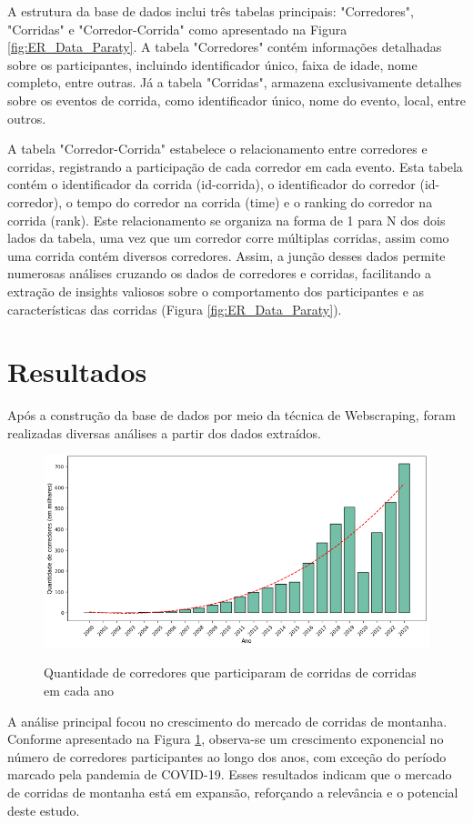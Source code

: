 A estrutura da base de dados inclui três tabelas principais: "Corredores", "Corridas" e "Corredor-Corrida" como apresentado na Figura \ref{fig:ER_Data_Paraty}. A tabela "Corredores" contém informações detalhadas sobre os participantes, incluindo identificador único, faixa de idade, nome completo, entre outras. Já a tabela "Corridas", armazena exclusivamente detalhes sobre os eventos de corrida, como identificador único, nome do evento, local, entre outros.

A tabela "Corredor-Corrida" estabelece o relacionamento entre corredores e corridas, registrando a participação de cada corredor em cada evento. Esta tabela contém o identificador da corrida (id-corrida), o identificador do corredor (id-corredor), o tempo do corredor na corrida (time) e o ranking do corredor na corrida (rank). Este relacionamento se organiza na forma de 1 para N dos dois lados da tabela, uma vez que um corredor corre múltiplas corridas, assim como uma corrida contém diversos corredores. Assim, a junção desses dados permite numerosas análises cruzando os dados de corredores e corridas, facilitando a extração de insights valiosos sobre o comportamento dos participantes e as características das corridas (Figura \ref{fig:ER_Data_Paraty}).

\section{Resultados}

Após a construção da base de dados por meio da técnica de Webscraping, foram realizadas diversas análises a partir dos dados extraídos.

\begin{figure}
    \centering
    \caption{Quantidade de corredores que participaram de corridas de corridas em cada ano}
    \includegraphics[width = 0.7\linewidth]{relatorios/paraty/figuras/Grafico_participantes.png}
    \label{fig:Participantes}
\end{figure}

A análise principal focou no crescimento do mercado de corridas de montanha. Conforme apresentado na Figura \ref{fig:Participantes}, observa-se um crescimento exponencial no número de corredores participantes ao longo dos anos, com exceção do período marcado pela pandemia de COVID-19. Esses resultados indicam que o mercado de corridas de montanha está em expansão, reforçando a relevância e o potencial deste estudo.

